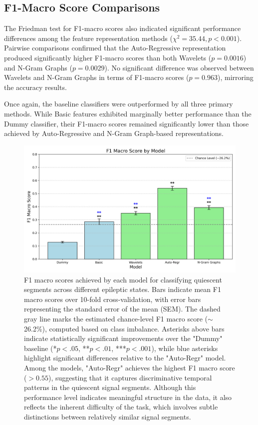 \documentclass{article}
\begin{document}
\subsection*{F1-Macro Score Comparisons}
The Friedman test for F1-macro scores also indicated significant performance differences among the feature representation methods (\(
\chi^2 = 35.44, p < 0.001
\)).
Pairwise comparisons confirmed that the Auto-Regressive representation produced significantly higher F1-macro scores than both Wavelets (\(
p = 0.0016
\))
and N-Gram Graphs (\(
p = 0.0029
\)).
No significant difference was observed between Wavelets and N-Gram Graphs in terms of F1-macro scores (\(
p = 0.963
\)),
mirroring the accuracy results.

Once again, the baseline classifiers were outperformed by all three primary methods. While Basic features exhibited marginally better performance than the Dummy classifier, their F1-macro scores remained significantly lower than those achieved by Auto-Regressive and N-Gram Graph-based representations.

\begin{figure}[htbp]
	\centering
	\includegraphics[width=\linewidth]{barplot_f1_macro.png}
	\caption[Classification F1-macro scores across representation models]{%
		F1 macro scores achieved by each model for classifying quiescent segments across different epileptic states. Bars indicate mean F1 macro scores over 10-fold cross-validation, with error bars representing the standard error of the mean (SEM). The dashed gray line marks the estimated chance-level F1 macro score ($\sim$26.2\%), computed based on class imbalance. Asterisks above bars indicate statistically significant improvements over the "Dummy" baseline (*$p < .05$, **$p < .01$, ***$p < .001$), while blue asterisks highlight significant differences relative to the "Auto-Regr" model. Among the models, "Auto-Regr" achieves the highest F1 macro score ($>0.55$), suggesting that it captures discriminative temporal patterns in the quiescent signal segments. Although this performance level indicates meaningful structure in the data, it also reflects the inherent difficulty of the task, which involves subtle distinctions between relatively similar signal segments.%
	}
	\label{fig:f1macro}
	\end{figure}
\end{document}
